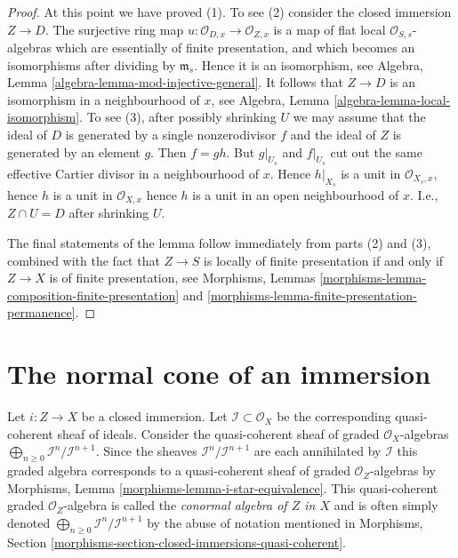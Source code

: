 \begin{proof}
\medskip\noindent
At this point we have proved (1). To see (2) consider the closed
immersion $Z \to D$. The surjective ring map
$u : \mathcal{O}_{D, x} \to \mathcal{O}_{Z, x}$
is a map of flat local $\mathcal{O}_{S, s}$-algebras which
are essentially of finite presentation, and which becomes an
isomorphisms after dividing by $\mathfrak m_s$. Hence it is
an isomorphism, see
Algebra, Lemma \ref{algebra-lemma-mod-injective-general}.
It follows that $Z \to D$ is an isomorphism in a neighbourhood
of $x$, see
Algebra, Lemma \ref{algebra-lemma-local-isomorphism}.
To see (3), after possibly shrinking $U$ we may assume that
the ideal of $D$ is generated by a single nonzerodivisor $f$
and the ideal of $Z$ is generated by an element $g$. Then
$f = gh$. But $g|_{U_s}$ and $f|_{U_s}$ cut out the same
effective Cartier divisor in a neighbourhood of $x$. Hence
$h|_{X_s}$ is a unit in $\mathcal{O}_{X_s, x}$, hence $h$ is
a unit in $\mathcal{O}_{X, x}$ hence $h$ is a unit in an
open neighbourhood of $x$. I.e., $Z \cap U = D$ after shrinking $U$.

\medskip\noindent
The final statements of the lemma follow immediately from
parts (2) and (3), combined with the fact that $Z \to S$
is locally of finite presentation if and only if $Z \to X$ is
of finite presentation, see
Morphisms, Lemmas \ref{morphisms-lemma-composition-finite-presentation} and
\ref{morphisms-lemma-finite-presentation-permanence}.
\end{proof}



\section{The normal cone of an immersion}
\label{section-normal-cone}

\noindent
Let $i : Z \to X$ be a closed immersion. Let
$\mathcal{I} \subset \mathcal{O}_X$ be the corresponding quasi-coherent
sheaf of ideals. Consider the quasi-coherent sheaf of graded
$\mathcal{O}_X$-algebras
$\bigoplus_{n \geq 0} \mathcal{I}^n/\mathcal{I}^{n + 1}$.
Since the sheaves $\mathcal{I}^n/\mathcal{I}^{n + 1}$
are each annihilated by $\mathcal{I}$ this graded algebra
corresponds to a quasi-coherent sheaf of graded $\mathcal{O}_Z$-algebras
by
Morphisms, Lemma \ref{morphisms-lemma-i-star-equivalence}.
This quasi-coherent graded $\mathcal{O}_Z$-algebra is called the
{\it conormal algebra of $Z$ in $X$} and is often simply denoted
$\bigoplus_{n \geq 0} \mathcal{I}^n/\mathcal{I}^{n + 1}$
by the abuse of notation mentioned in
Morphisms, Section \ref{morphisms-section-closed-immersions-quasi-coherent}.

